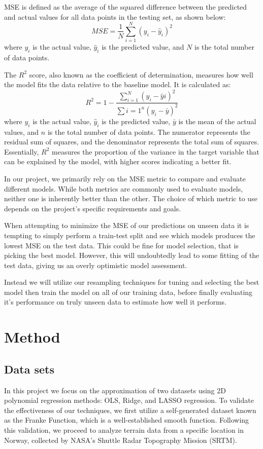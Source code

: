 \documentclass{article}
\begin{document}
MSE is defined as the average of the squared difference between the predicted and actual values for all data points in the testing set, as shown below:
\begin{equation*}    
    MSE = \frac{1}{N}\sum_{i=1}^{N}(y_i - \hat{y}_i)^2
\end{equation*}
where $y_i$ is the actual value, $\hat{y}_i$ is the predicted value, and $N$ is the total number of data points.

The $R^2$ score, also known as the coefficient of determination, measures how well the model fits the data relative to the baseline model. It is calculated as:
\begin{equation*}
    R^2 = 1 - \frac{\sum_{i=1}^{N}(y_i - \hat{y}i)^2}{\sum{i=1}^{n}(y_i - \bar{y})^2}
\end{equation*}
where $y_i$ is the actual value, $\hat{y}_i$ is the predicted value, $\bar{y}$ is the mean of the actual values, and $n$ is the total number of data points. The numerator represents the residual sum of squares, and the denominator represents the total sum of squares. Essentially, $R^2$ measures the proportion of the variance in the target variable that can be explained by the model, with higher scores indicating a better fit.

In our project, we primarily rely on the MSE metric to compare and evaluate different models. While both metrics are commonly used to evaluate models, neither one is inherently better than the other. The choice of which metric to use depends on the project's specific requirements and goals.

When attempting to minimize the MSE of our predictions on unseen data it is tempting to simply perform a train-test split and see which models produces the lowest MSE on the test data. This could be fine for model selection, that is picking the best model. However, this will undoubtedly lead to some fitting of the test data, giving us an overly optimistic model assessment.

Instead we will utilize our resampling techniques for tuning and selecting the best model then train the model on all of our training data, before finally evaluating it's performance on truly unseen data to estimate how well it performs.

\newpage
\section{Method}
\subsection{Data sets}
In this project we focus on the approximation of two datasets using 2D polynomial regression methods: OLS, Ridge, and LASSO regression. To validate the effectiveness of our techniques, we first utilize a self-generated dataset known as the Franke Function, which is a well-established smooth function. Following this validation, we proceed to analyze terrain data from a specific location in Norway, collected by NASA's Shuttle Radar Topography Mission (SRTM).
\end{document}
